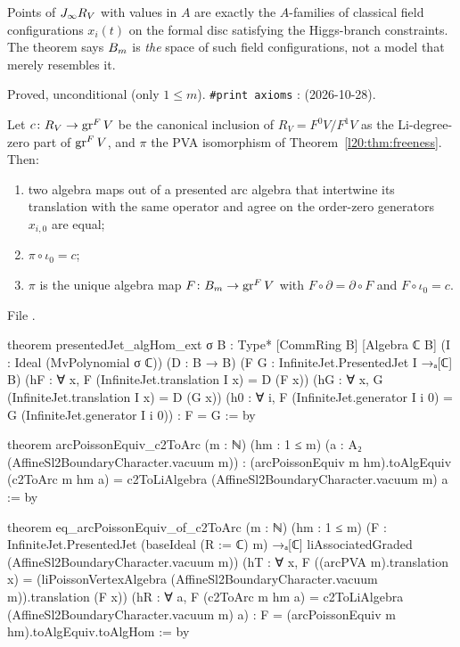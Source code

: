 \begin{physics}
Points of $J_\infty R_V$ with values in $A$ are exactly the $A$-families of classical field configurations
$x_i(t)$ on the formal disc satisfying the Higgs-branch constraints. The theorem says $B_m$ is \emph{the} space of
such field configurations, not a model that merely resembles it.
\end{physics}

\begin{status}
Proved, unconditional (only $1\le m$). \texttt{\#print axioms} :
 (2026-10-28).
\end{status}

\begin{theorem}\label{l20:thm:pvacanon}
Let $c\colon R_V\to\operatorname{gr}^F V$ be the canonical inclusion of $R_V=F^0V/F^1V$ as the Li-degree-zero part of $\operatorname{gr}^F V$,
and $\pi$ the PVA isomorphism  of Theorem~\ref{l20:thm:freeness}. Then:
\begin{enumerate}
\item two algebra maps out of a presented arc algebra that intertwine its translation with the same operator and agree on the
  order-zero generators $x_{i,0}$ are equal;
\item $\pi\circ\iota_0=c$;
\item $\pi$ is the unique algebra map $F\colon B_m\to\operatorname{gr}^F V$ with $F\circ\partial=\partial\circ F$ and $F\circ\iota_0=c$.
\end{enumerate}
\end{theorem}
\noindent File .
\begin{leancode}
theorem presentedJet_algHom_ext {σ B : Type*} [CommRing B] [Algebra ℂ B]
    (I : Ideal (MvPolynomial σ ℂ)) (D : B → B)
    (F G : InfiniteJet.PresentedJet I →ₐ[ℂ] B)
    (hF : ∀ x, F (InfiniteJet.translation I x) = D (F x))
    (hG : ∀ x, G (InfiniteJet.translation I x) = D (G x))
    (h0 : ∀ i, F (InfiniteJet.generator I i 0) = G (InfiniteJet.generator I i 0)) : F = G := by

theorem arcPoissonEquiv_c2ToArc (m : ℕ) (hm : 1 ≤ m)
    (a : A₂ (AffineSl2BoundaryCharacter.vacuum m)) :
    (arcPoissonEquiv m hm).toAlgEquiv (c2ToArc m hm a) =
      c2ToLiAlgebra (AffineSl2BoundaryCharacter.vacuum m) a := by

theorem eq_arcPoissonEquiv_of_c2ToArc (m : ℕ) (hm : 1 ≤ m)
    (F : InfiniteJet.PresentedJet (baseIdeal (R := ℂ) m) →ₐ[ℂ]
      liAssociatedGraded (AffineSl2BoundaryCharacter.vacuum m))
    (hT : ∀ x, F ((arcPVA m).translation x) =
      (liPoissonVertexAlgebra (AffineSl2BoundaryCharacter.vacuum m)).translation (F x))
    (hR : ∀ a, F (c2ToArc m hm a) = c2ToLiAlgebra (AffineSl2BoundaryCharacter.vacuum m) a) :
    F = (arcPoissonEquiv m hm).toAlgEquiv.toAlgHom := by
\end{leancode}

